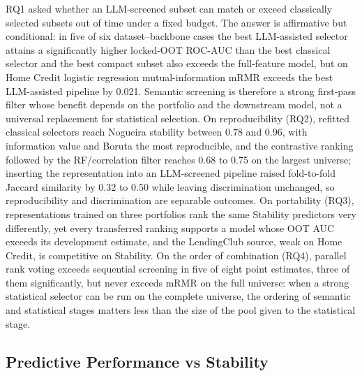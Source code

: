\documentclass[final,5p,twocolumn]{elsarticle}
\begin{document}
RQ1 asked whether an LLM-screened subset can match or exceed classically selected subsets out of time under a fixed budget. The answer is affirmative but conditional: in five of six dataset--backbone cases the best LLM-assisted selector attains a significantly higher locked-OOT ROC-AUC than the best classical selector and the best compact subset also exceeds the full-feature model, but on Home Credit logistic regression mutual-information mRMR exceeds the best LLM-assisted pipeline by 0.021. Semantic screening is therefore a strong first-pass filter whose benefit depends on the portfolio and the downstream model, not a universal replacement for statistical selection. On reproducibility (RQ2), refitted classical selectors reach Nogueira stability between 0.78 and 0.96, with information value and Boruta the most reproducible, and the contrastive ranking followed by the RF/correlation filter reaches 0.68 to 0.75 on the largest universe; inserting the representation into an LLM-screened pipeline raised fold-to-fold Jaccard similarity by 0.32 to 0.50 while leaving discrimination unchanged, so reproducibility and discrimination are separable outcomes. On portability (RQ3), representations trained on three portfolios rank the same Stability predictors very differently, yet every transferred ranking supports a model whose OOT AUC exceeds its development estimate, and the LendingClub source, weak on Home Credit, is competitive on Stability. On the order of combination (RQ4), parallel rank voting exceeds sequential screening in five of eight point estimates, three of them significantly, but never exceeds mRMR on the full universe: when a strong statistical selector can be run on the complete universe, the ordering of semantic and statistical stages matters less than the size of the pool given to the statistical stage.

\subsection{Predictive Performance vs Stability}
\label{subsec:performance_vs_stability}
\end{document}
